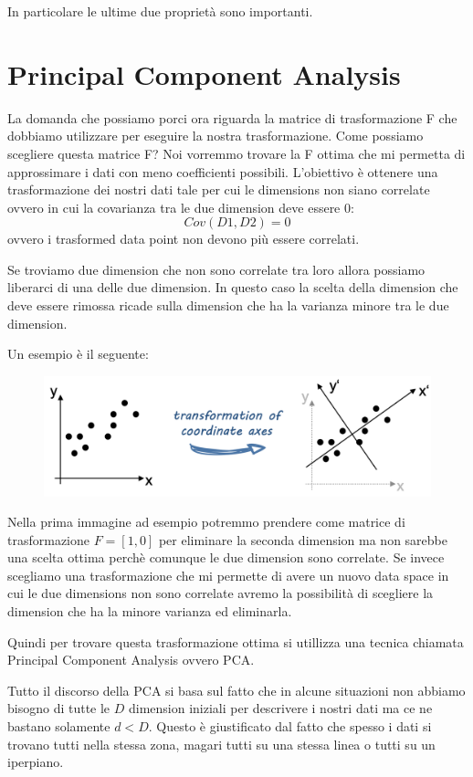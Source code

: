 \documentclass[14pt]{extreport}
\begin{document}
In particolare le ultime due proprietà sono importanti.

\section{Principal Component Analysis}

La domanda che possiamo porci ora riguarda la matrice di trasformazione F che dobbiamo utilizzare per eseguire la nostra trasformazione. Come possiamo
scegliere questa matrice F? Noi vorremmo trovare la F ottima che mi permetta di approssimare i dati con meno coefficienti possibili. L'obiettivo è
ottenere una trasformazione dei nostri dati tale per cui le dimensions non siano correlate ovvero in cui la covarianza tra le due dimension deve
essere 0:
$$Cov(D1,D2) = 0$$ ovvero i trasformed data point non devono più essere correlati.

Se troviamo due dimension che non sono correlate tra loro allora possiamo liberarci di una delle due dimension. In questo caso la scelta della
dimension che deve essere rimossa ricade sulla dimension che ha la varianza minore tra le due dimension.

Un esempio è il seguente:

\begin{figure}[H]
	\centering
	\includegraphics[width=0.7\linewidth]{438.jpeg}
\end{figure}

Nella prima immagine ad esempio potremmo prendere come matrice di trasformazione $F = [1,0]$ per eliminare la seconda dimension ma non sarebbe una
scelta ottima perchè comunque le due dimension sono correlate. Se invece scegliamo una trasformazione che mi permette di avere un nuovo data space in
cui le due dimensions non sono correlate avremo la possibilità di scegliere la dimension che ha la minore varianza ed eliminarla.

Quindi per trovare questa trasformazione ottima si utillizza una tecnica chiamata Principal Component Analysis ovvero PCA.

Tutto il discorso della PCA si basa sul fatto che in alcune situazioni non abbiamo bisogno di tutte le $D$ dimension iniziali per descrivere i nostri
dati ma ce ne bastano solamente $d<D$. Questo è giustificato dal fatto che spesso i dati si trovano tutti nella stessa zona, magari tutti su una
stessa linea o tutti su un iperpiano.
\end{document}
